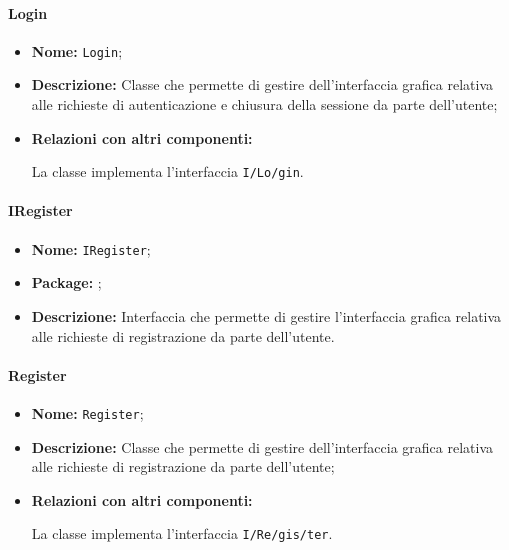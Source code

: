 \paragraph{Login}
\begin{flushleft}
\begin{itemize}
\item \textbf{Nome:} \texttt{Login};
\item \textbf{Descrizione:} Classe che permette di gestire dell'interfaccia grafica relativa alle richieste di autenticazione e chiusura della sessione da parte dell'utente;
\item \textbf{Relazioni con altri componenti:}
\begin{sloppypar}
La classe implementa l'interfaccia \texttt{I\fshyp{}Lo\fshyp{}gin}.
\end{sloppypar}
\end{itemize}
\end{flushleft}

\paragraph{IRegister}
\begin{itemize}
\item \textbf{Nome:} \texttt{IRegister};
\item \textbf{Package:} \texttt{\iViewUser{}};
\item \textbf{Descrizione:} Interfaccia che permette di gestire l'interfaccia grafica relativa alle richieste di registrazione da parte dell'utente.
\end{itemize}

\paragraph{Register}
\begin{flushleft}
\begin{itemize}
\item \textbf{Nome:} \texttt{Register};
\item \textbf{Descrizione:} Classe che permette di gestire dell'interfaccia grafica relativa alle richieste di registrazione da parte dell'utente;
\item \textbf{Relazioni con altri componenti:}
\begin{sloppypar}
La classe implementa l'interfaccia \texttt{I\fshyp{}Re\fshyp{}gis\fshyp{}ter}.
\end{sloppypar}
\end{itemize}
\end{flushleft}

